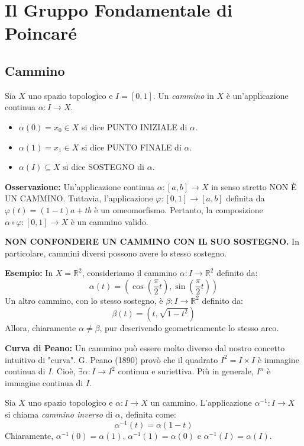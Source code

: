 \chapter{Il Gruppo Fondamentale di Poincar\'e}

\section{Cammino}
\begin{definicion} Sia $X$ uno spazio topologico e $I = [0,1]$. Un \textit{cammino} in $X$ \`e un'applicazione continua $\alpha: I \to X$.
\begin{itemize}
    \item $\alpha(0) = x_0 \in X$ si dice PUNTO INIZIALE di $\alpha$.
    \item $\alpha(1) = x_1 \in X$ si dice PUNTO FINALE di $\alpha$.
    \item $\alpha(I) \subseteq X$ si dice SOSTEGNO di $\alpha$.
\end{itemize}
\end{definicion}
\textbf{Osservazione:} Un'applicazione continua $\alpha: [a,b] \to X$ in senso stretto NON \`E UN CAMMINO. Tuttavia, l'applicazione $\varphi: [0,1] \to [a,b]$ definita da $\varphi(t) = (1-t)a + tb$ \`e un omeomorfismo. Pertanto, la composizione $\alpha \circ \varphi: [0,1] \to X$ \`e un cammino valido.

\textbf{NON CONFONDERE UN CAMMINO CON IL SUO SOSTEGNO.} In particolare, cammini diversi possono avere lo stesso sostegno.

\textbf{Esempio:} In $X = \mathbb{R}^2$, consideriamo il cammino $\alpha: I \to \mathbb{R}^2$ definito da:
\[ \alpha(t) = \left( \cos\left(\frac{\pi}{2}t\right), \sin\left(\frac{\pi}{2}t\right) \right) \]
Un altro cammino, con lo stesso sostegno, \`e $\beta: I \to \mathbb{R}^2$ definito da:
\[ \beta(t) = (t, \sqrt{1-t^2}) \]
Allora, chiaramente $\alpha \neq \beta$, pur descrivendo geometricamente lo stesso arco.

\textbf{Curva di Peano:} Un cammino pu\`o essere molto diverso dal nostro concetto intuitivo di "curva". G. Peano (1890) prov\`o che il quadrato $I^2 = I \times I$ \`e immagine continua di $I$. Cio\`e, $\exists \alpha: I \to I^2$ continua e suriettiva. Pi\`u in generale, $I^n$ \`e immagine continua di $I$.

\begin{definicion} Sia $X$ uno spazio topologico e $\alpha: I \to X$ un cammino. L'applicazione $\alpha^{-1}: I \to X$ si chiama \textit{cammino inverso} di $\alpha$, definita come:
\[ \alpha^{-1}(t) = \alpha(1-t) \]
Chiaramente, $\alpha^{-1}(0) = \alpha(1)$, $\alpha^{-1}(1) = \alpha(0)$ e $\alpha^{-1}(I) = \alpha(I)$.
\end{definicion}

